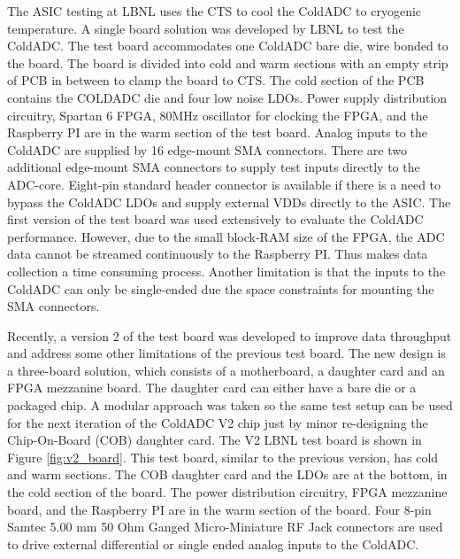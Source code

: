 \label{sec:2.4}
The ASIC testing at LBNL uses the CTS to cool the ColdADC to cryogenic temperature. A single board solution was 
developed by LBNL to test the ColdADC. The test board accommodates one ColdADC bare die, wire bonded to the board. 
The board is divided into cold and warm sections with an empty strip of PCB in between to clamp the board to CTS.
The cold section of the PCB contains the COLDADC die and four low noise LDOs.
Power supply distribution circuitry, Spartan 6 FPGA,  80MHz oscillator for clocking 
the FPGA, and the Raspberry PI are in the warm section of the test board. Analog inputs to 
the ColdADC are supplied by 16 edge-mount SMA connectors. There are two additional edge-mount SMA connectors 
to supply test inputs directly to the ADC-core. Eight-pin standard header connector is available if there is 
a need to bypass the ColdADC LDOs and supply external VDDs directly to the ASIC.
The first version of the test board was used extensively to evaluate the ColdADC performance.  However, due to the small 
block-RAM size of the FPGA, the ADC data cannot be streamed continuously to the Raspberry PI. Thus makes
data collection a time consuming process. Another limitation is that the inputs to the ColdADC can only be single-ended due 
the space constraints for mounting the SMA connectors.

Recently, a version 2 of the test board was developed to improve data throughput and address some other limitations 
of the previous test board.  The new design is a three-board 
solution, which consists of a motherboard, a daughter card and an FPGA mezzanine board. The daughter card can either have a 
bare die or a packaged chip. A modular approach was taken so the same test setup 
can be used for the next iteration of the ColdADC V2 chip just by minor re-designing the Chip-On-Board (COB) daughter card. The V2 LBNL 
test board is shown in Figure \ref{fig:v2_board}. This test board, similar to the previous version, has cold and warm 
sections. The COB daughter card and the LDOs are at the bottom, in the cold section of the board. The power 
distribution circuitry, FPGA mezzanine board, and the Raspberry PI are in the warm section of the board. 
Four 8-pin Samtec 5.00 mm 50 Ohm Ganged Micro-Miniature RF Jack connectors are used to drive external 
differential or single ended analog inputs to the ColdADC.  

